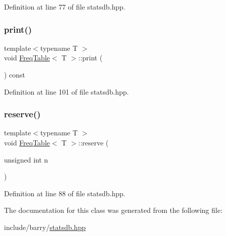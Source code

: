 Definition at line 77 of file statsdb.\+hpp.

\mbox{\label{class_freq_table_a4fe8f5e3b5bf64a1cbaf99deb96298d4}} 
\subsubsection{\texorpdfstring{print()}{print()}}
{\footnotesize\ttfamily template$<$typename T $>$ \\
void \hyperlink{class_freq_table}{Freq\+Table}$<$ T $>$\+::print (\begin{DoxyParamCaption}{ }\end{DoxyParamCaption}) const\hspace{0.3cm}{\ttfamily [inline]}}



Definition at line 101 of file statsdb.\+hpp.

\mbox{\label{class_freq_table_a0bdced25f7c0bee38e073c4654578d19}} 
\subsubsection{\texorpdfstring{reserve()}{reserve()}}
{\footnotesize\ttfamily template$<$typename T $>$ \\
void \hyperlink{class_freq_table}{Freq\+Table}$<$ T $>$\+::reserve (\begin{DoxyParamCaption}\item[{unsigned int}]{n }\end{DoxyParamCaption})\hspace{0.3cm}{\ttfamily [inline]}}



Definition at line 88 of file statsdb.\+hpp.



The documentation for this class was generated from the following file\+:\begin{DoxyCompactItemize}
\item 
include/barry/\hyperlink{statsdb_8hpp}{statsdb.\+hpp}\end{DoxyCompactItemize}
